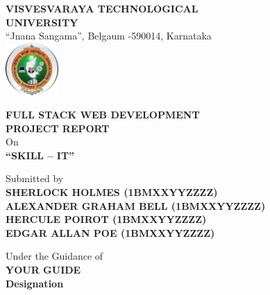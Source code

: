 
\begin{titlepage}
    \centering
    
    \textbf{
    {\large VISVESVARAYA TECHNOLOGICAL}\\[0.5em]
    {\large UNIVERSITY}}\\[0.5em]
    {\large “Jnana Sangama”, Belgaum -590014, Karnataka} \\
    
    \vspace*{0.5cm}
    \includegraphics[width=0.15\textwidth]{vtu.png} \\

    \vspace{0.5cm}
    
    {\large \textbf{FULL STACK WEB DEVELOPMENT}}\\[0.5em]
    {\large \textbf{PROJECT REPORT}} \\
    \vspace{0.25cm}
    {\large On} \\
    \vspace{0.5cm}
    {\Large \textbf{“SKILL – IT”}} \\
    
    \vspace{0.5cm}
    
    {\large Submitted by} \\
    \vspace{0.5cm}
    \textbf{
    {\large SHERLOCK HOLMES (1BMXXYYZZZZ)} \\
    {\large ALEXANDER GRAHAM BELL (1BMXXYYZZZZ)} \\
    {\large HERCULE POIROT (1BMXXYYZZZZ)} \\
    {\large EDGAR ALLAN POE (1BMXXYYZZZZ)} \\
    }
    \vspace{0.75cm}
    
    {\large Under the Guidance of} \\
    \textbf{
    {\large YOUR GUIDE}\\
    {\large Designation} \\
    }
    \vspace{0.5cm}
    

\end{titlepage}
